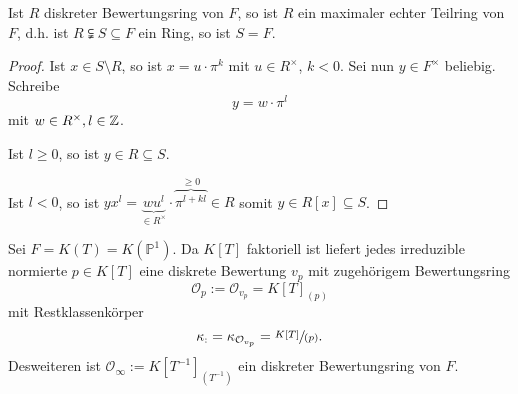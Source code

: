 \begin{lemma}
    Ist $R$ diskreter Bewertungsring von $F$, so ist $R$ ein maximaler echter Teilring von $F$, d.h. ist
    $R \subsetneqq S \subseteq F$ ein Ring, so ist $S = F$.
\end{lemma}
\begin{proof}
    Ist $x \in S \setminus R$, so ist $x = u \cdot \pi^k$ mit $u \in R^\times$, $k< 0$.
    Sei nun $y \in F^\times$ beliebig. Schreibe
    $$ y = w \cdot \pi^l$$
    mit $w \in R^\times, l \in \mathbb{Z}$.

    Ist \underline{$l \geq 0$}, so ist $y \in R \subseteq S$.

    Ist \underline{$l < 0$}, so ist $yx^l=\underbrace{wu^l}_{\in R^\times} \cdot \overbrace{\pi^{l+kl}}^{\geq 0}\in R$
    somit $y \in R[x] \subseteq S$.
\end{proof}

\begin{beispiel}
    Sei $F = K(T) = K(\mathbb{P}^1)$. Da $K[T]$ faktoriell ist liefert jedes irreduzible normierte $p\in K[T]$ eine 
    diskrete Bewertung $v_p$ mit zugehörigem Bewertungsring
    $$ \mathcal{O}_p := \mathcal{O}_{v_p} = K[T]_{(p)}$$
    mit Restklassenkörper
    $$ \kappa_ := \kappa_{\mathcal{O}_{v_p}} = \sfrac{K[T]}{(p)}.$$
    Desweiteren ist $\mathcal{O}_\infty := K[T^{-1}]_{(T^{-1})}$ ein diskreter Bewertungsring von $F$.
\end{beispiel}